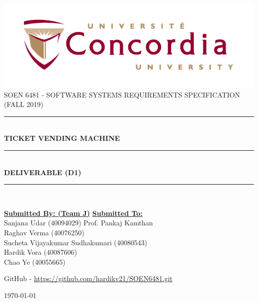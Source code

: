\documentclass[12pt]{report}
\begin{document}
	

\begin{titlepage}
	\newcommand{\HRule}{\rule{\linewidth}{0.5mm}} %
	
	
	\centering 
	\includegraphics[scale=.5]{logo.png}\\[1cm] 
	\textsc{\Large SOEN 6481 - SOFTWARE SYSTEMS REQUIREMENTS SPECIFICATION (FALL 2019)} \\  [0.5cm]
	
	
	\HRule \\[0.4cm]
	{ \huge \bfseries TICKET VENDING MACHINE}\\[0.4cm] 
	\HRule \\[0.5cm]
	
	{\large \textbf{DELIVERABLE (D1)} }	
	
	\HRule \\[1.5cm]
	\vspace{1cm}
	
	\begin{flushleft}
		
		
		\textbf{\underline{\Large Submitted By: (Team J)}}
		\hfill
		\textbf{\underline{\Large Submitted To:}} \\
		\vspace{3mm}
		\large Sanjana Udar (40094029)
		\hfill
		\large Prof. Pankaj Kamthan \\
		
		\large Raghav Verma (40076250) \hfill \\
		\large Sucheta Vijayakumar Sudhakumari (40080543) \hfill \\
		\large Hardik Vora (40087606) \hfill \\
		\large Chao Ye (40055665) \\
		
	\end{flushleft}
	
	\centering \vspace{1cm}
	
	GitHub - \href{https://github.com/hardikv21/SOEN6481.git}{https://github.com/hardikv21/SOEN6481.git}
	
	\vspace{0.1cm}
	{\large \today}\\[2cm]
	
	\vfill
\end{titlepage}
\end{document}
